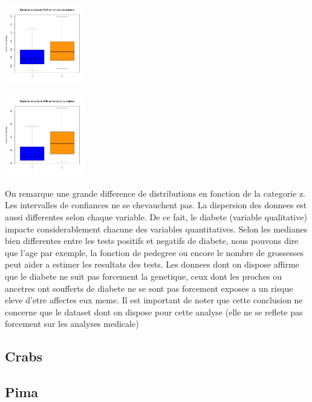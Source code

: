 \documentclass[10pt]{article}
\begin{document}
\begin{center}
\begin{minipage}[t]{0.3\textwidth}
	\end{minipage}
	\newline
	\begin{minipage}[t]{0.3\textwidth}
		\includegraphics[width=35mm]{Figures/Pima/bxp_z_ped.png}
	\end{minipage}
	\begin{minipage}[t]{0.3\textwidth}
		\includegraphics[width=35mm]{Figures/Pima/bxp_z_age.png}
	\end{minipage}
\end{center}

On remarque une grande difference de distributions en fonction de la categorie z. Les intervalles de confiances ne se chevauchent pas. La dispersion des donnees est aussi differentes selon chaque variable. De ce fait, le diabete (variable  qualitative) impacte considerablement chacune des variables quantitatives. 
Selon les medianes bien differentes entre les tests positifs et negatifs de diabete, nous pouvons dire que l'age par exemple, la fonction de pedegree ou encore le nombre de grossesses peut aider a estimer les resultats des tests.
Les donnees dont on dispose affirme que le diabete ne suit pas forcement la genetique, ceux dont les proches ou ancetres ont soufferts de diabete ne se sont pas forcement exposes a un risque eleve d'etre affectes eux meme. Il est important de noter que cette conclusion ne concerne que le dataset dont on dispose pour cette analyse (elle ne se reflete pas forcement sur les analyses medicale)

\subsection{Crabs}

\subsection{Pima}
\end{document}
